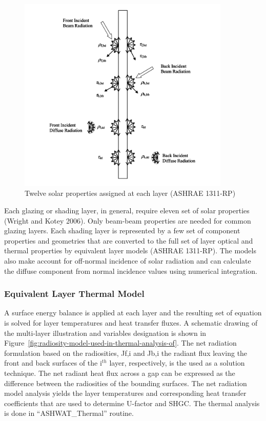 \begin{figure}[hbtp] %
\centering
\includegraphics[width=0.9\textwidth, height=0.9\textheight, keepaspectratio=true]{media/image1830.svg.png}
\caption{Twelve solar properties assigned at each layer (ASHRAE 1311-RP) \protect \label{fig:twelve-solar-properties-assigned-at-each}}
\end{figure}

Each glazing or shading layer, in general, require eleven set of solar properties (Wright and Kotey 2006). Only beam-beam properties are needed for common glazing layers. Each shading layer is represented by a few set of component properties and geometries that are converted to the full set of layer optical and thermal properties by equivalent layer models (ASHRAE 1311-RP). The models also make account for off-normal incidence of solar radiation and can calculate the diffuse component from normal incidence values using numerical integration.

\subsubsection{Equivalent Layer Thermal Model}\label{equivalent-layer-thermal-model}

A surface energy balance is applied at each layer and the resulting set of equation is solved for layer temperatures and heat transfer fluxes. A schematic drawing of the multi-layer illustration and variables designation is shown in Figure~\ref{fig:radiosity-model-used-in-thermal-analysis-of}. The net radiation formulation based on the radiosities, Jf,i and Jb,i the radiant flux leaving the front and back surfaces of the i\(^{th}\) layer, respectively, is the used as a solution technique. The net radiant heat flux across a gap can be expressed as the difference between the radiosities of the bounding surfaces. The net radiation model analysis yields the layer temperatures and corresponding heat transfer coefficients that are used to determine U-factor and SHGC. The thermal analysis is done in ``ASHWAT\_Thermal'' routine.

